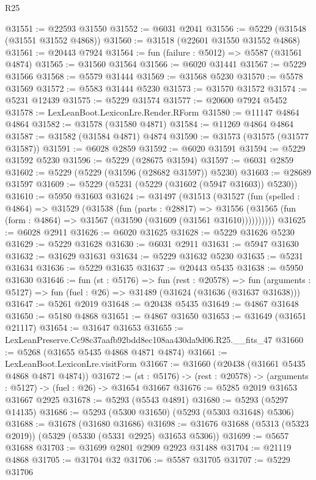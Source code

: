 \begin{lexlean}{R25}
\begin{coremodule}
@31551 := @22593 @31550
@31552 := @6031 @2041
@31556 := @5229 (@31548 (@31551 @31552 @4868))
@31560 := @31518 (@22601 @31550 @31552 @4868)
@31561 := @20443 @7924
@31564 := fun (failure : @5012) => @5587 (@31561 @4874)
@31565 := @31560 @31564
@31566 := @6020 @31441
@31567 := @5229 @31566
@31568 := @5579 @31444
@31569 := @31568 @5230
@31570 := @5578 @31569
@31572 := @5583 @31444 @5230
@31573 := @31570 @31572
@31574 := @5231 @12439
@31575 := @5229 @31574
@31577 := @20600 @7924 @5452
@31578 := LexLeanBoot.LexiconLre.Render.RForm
@31580 := @11147 @4864 @4864
@31582 := @31578 (@31580 @4871)
@31584 := @11269 @4864 @4864
@31587 := @31582 (@31584 @4871) @4874
@31590 := @31573 (@31575 (@31577 @31587))
@31591 := @6028 @2859
@31592 := @6020 @31591
@31594 := @5229 @31592 @5230
@31596 := @5229 (@28675 @31594)
@31597 := @6031 @2859
@31602 := @5229 (@5229 (@31596 (@28682 @31597)) @5230)
@31603 := @28689 @31597
@31609 := @5229 (@5231 (@5229 (@31602 (@5947 @31603)) @5230))
@31610 := @5950 @31603
@31624 := @31497
    (@31513
      (@31527
        (fun (spelled : @4864) =>
        @31529
          (@31538
            (fun (parts : @28817) =>
            @31556 (@31565 (fun (form : @4864) => @31567 (@31590 (@31609 (@31561 @31610))))))))))
@31625 := @6028 @2911
@31626 := @6020 @31625
@31628 := @5229 @31626 @5230
@31629 := @5229 @31628
@31630 := @6031 @2911
@31631 := @5947 @31630
@31632 := @31629 @31631
@31634 := @5229 @31632 @5230
@31635 := @5231 @31634
@31636 := @5229 @31635
@31637 := @20443 @5435
@31638 := @5950 @31630
@31646 := fun (st : @5176) =>
  fun (rest : @20578) =>
  fun (arguments : @5127) => fun (fuel : @26) => @31489 (@31624 (@31636 (@31637 @31638)))
@31647 := @5261 @2019
@31648 := @20438 @5435
@31649 := @4867 @31648
@31650 := @5180 @4868
@31651 := @4867 @31650
@31653 := @31649 (@31651 @21117)
@31654 := @31647 @31653
@31655 := LexLeanPreserve.Cc98c37aafb92bdd8ec108aa430da9d06.R25.__fits_47
@31660 := @5268 (@31655 @5435 @4868 @4871 @4874)
@31661 := LexLeanBoot.LexiconLre.visitForm
@31667 := @31660 (@20438 (@31661 @5435 @4868 @4871 @4874))
@31672 := (st : @5176) -> (rest : @20578) -> (arguments : @5127) -> (fuel : @26) -> @31654 @31667
@31676 := @5285 @2019 @31653 @31667 @2925
@31678 := @5293 (@5543 @4891)
@31680 := @5293 (@5297 @14135)
@31686 := @5293 (@5300 @31650) (@5293 (@5303 @31648) @5306)
@31688 := @31678 (@31680 @31686)
@31698 := @31676 @31688 (@5313 (@5323 @2019)) (@5329 (@5330 (@5331 @2925) @31653 @5306))
@31699 := @5657 @31688
@31703 := @31699 @2801 @2909 @2923 @31488
@31704 := @21119 @4868
@31705 := @31704 @32
@31706 := @5587 @31705
@31707 := @5229 @31706

\end{coremodule}
\end{lexlean}
